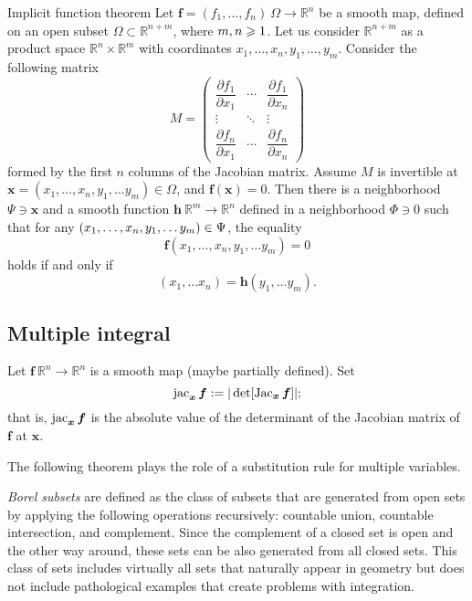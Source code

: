 \begin{thm}{Implicit function theorem}\label{thm:imlicit}
Let $\bm{f}=(f_1,\dots,f_n)\:\Omega\to\mathbb{R}^n$ be a smooth map, defined on an open subset $\Omega\subset\mathbb{R}^{n+m}$, where
$m,n\z\ge 1$.
Let us consider $\mathbb{R}^{n+m}$ as a product space $\mathbb{R}^n\times \mathbb{R}^m$ with coordinates 
$x_1,\dots,x_n,y_1,\dots,y_m$.
Consider the following matrix 
\[
M=\begin{pmatrix}
\dfrac{\partial f_1}{\partial x_1} & \cdots & \dfrac{\partial f_1}{\partial x_n}\\
\vdots & \ddots & \vdots\\
\dfrac{\partial f_n}{\partial x_1} & \cdots & \dfrac{\partial f_n}{\partial x_n} \end{pmatrix}\]
formed by the first $n$ columns of the Jacobian matrix.
Assume $M$ is invertible at $\bm{x}=(x_1,\dots,x_n,y_1,\dots y_m)\in \Omega$, and $\bm{f}(\bm{x})=0$.
Then there is a neighborhood $\Psi\ni \bm{x}$
and a smooth function $\bm{h}\:\mathbb{R}^m\to\mathbb{R}^n$ defined in a neighborhood $\Phi\ni 0$ such that
for any $(x_1,\dots,x_n,y_1,\dots y_m)\z\in \Psi$, the equality
\[\bm{f}(x_1,\dots,x_n,y_1,\dots y_m)=0\]
holds if and only if 
\[(x_1,\dots x_n)=\bm{h}(y_1,\dots y_m).\]

\end{thm}

\subsection*{Multiple integral}

Let $\bm{f}\:\mathbb{R}^n\to\mathbb{R}^n$ is a smooth map (maybe partially defined).
Set
\[\jac_{\bm{x}}\bm{f}\df|\det[\Jac_{\bm{x}}\bm{f}]|;\index{10j@$\jac$}\]
that is, $\mathop{\rm jac}\nolimits_{\bm{x}}\bm{f}$ is the absolute value of the determinant of the Jacobian matrix of $\bm{f}$ at $\bm{x}$.

The following theorem plays the role of a substitution rule for multiple variables.

\emph{Borel subsets} are defined as the class of subsets that are generated from open sets by applying the following operations recursively: countable union, countable intersection, and complement.
Since the complement of a closed set is open and the other way around, these sets can be also generated from all closed sets.
This class of sets includes virtually all sets that naturally appear in geometry but does not include pathological examples that create problems with integration.

